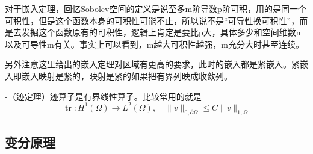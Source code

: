 对于嵌入定理，回忆Sobolev空间的定义是说至多m阶导数p阶可积，用的是同一个可积性，但是这个函数本身的可积性可能不止，所以说不是“可导性换可积性”，而是去发掘这个函数原有的可积性，逻辑上肯定是要比p大，具体多少和空间维数n以及可导性m有关。事实上可以看到，m越大可积性越强，m充分大时甚至连续。

另外注意这里给出的嵌入定理对区域有更高的要求，此时的嵌入都是紧嵌入。紧嵌入即嵌入映射是紧的，映射是紧的如果把有界列映成收敛列。

-（迹定理）迹算子是有界线性算子。比较常用的就是
\[
  \operatorname{tr}: H^1(\Omega) \to L^2(\Omega), \quad \|v\|_{0, \partial \Omega} \le C \|v\|_{1, \Omega}
\]

\subsection{变分原理}

